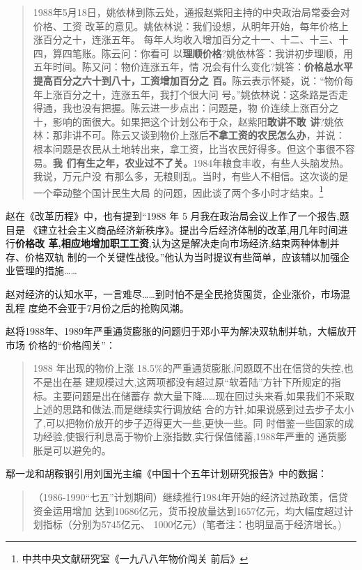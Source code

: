 \begin{quotation}
  1988年5月18日，姚依林到陈云处，通报赵紫阳主持的中央政治局常委会对价格、工资
  改革的意见。姚依林说：我们设想，从明年开始，每年价格上涨百分之十，连涨五年。
  每年人均收入增加百分之十一、十二、十三、十四，算四笔账。陈云问：你看可
  以\textbf{理顺价格}?姚依林答：我讲初步理顺，用五年时间。陈又问：物价连涨五年，情
  况会有什么变化?姚答：\textbf{价格总水平提高百分之六十到八十，工资增加百分之
    百。}陈云表示怀疑，说：“物价每年上涨百分之十，连涨五年，我打个很大问
  号。”姚依林说：这条路是否走得通，我也没有把握。陈云进一步点出：问题是，物
  价连续上涨百分之十，影响的面很大。如果把这个计划公布于众，赵紫阳\textbf{敢讲不敢
    讲}?姚依林：那非讲不可。陈云又谈到物价上涨后\textbf{不拿工资的农民怎么办}，并说：
  根本问题是农民从土地转出来，拿工资，比当农民好得多。但这个事很不容易。\textbf{我
    们有生之年，农业过不了关。}1984年粮食丰收，有些人头脑发热。我说，万元户没
  有那么多，无粮则乱。当时，有些人不相信。这次谈的是一个牵动整个国计民生大局
  的问题，因此谈了两个多小时才结束。\footnote{中共中央文献研究室《一九八八年物价闯关
    前后》}
\end{quotation}
赵在《改革历程》中，也有提到“1988 年 5 月我在政治局会议上作了一个报告,题目是
《建立社会主义商品经济新秩序》。提出今后经济体制的改革,用几年时间进行\textbf{价格改
  革,相应地增加职工工资},认为这是解决走向市场经济,结束两种体制并存、价格双轨
制的一个关键性战役。”他认为当时提议有些简单，应该辅以加强企业管理的措施……

赵对经济的认知水平，一言难尽……到时怕不是全民抢货囤货，企业涨价，市场混乱程
度绝不会亚于7月份之后的抢购风潮。

赵将1988年、1989年严重通货膨胀的问题归于邓小平为解决双轨制并轨，大幅放开市场
价格的“价格闯关”：
\begin{quotation}
  1988 年出现的物价上涨 18.5\%的严重通货膨胀,问题既不出在信贷的失控,也不是出在基
  建规模过大,这两项都没有超过原“软着陆”方针下所规定的指标。主要问题是出在储蓄存
  款大量下降……现在回过头来看,如果我们不采取上述的思路和做法,而是继续实行调放结
  合的方针,如果说感到过去步子太小了,可以把物价放开的步子迈得更大一些,更快一些。同
  时借鉴一些国家的成功经验,使银行利息高于物价上涨指数,实行保值储蓄,1988年严重的
  通货膨胀是可以避免的。
\end{quotation}

鄢一龙和胡鞍钢引用刘国光主编《中国十个五年计划研究报告》中的数据：
\begin{quotation}
（1986-1990“七五”计划期间）继续推行1984年开始的经济过热政策，信贷资金运用增加
达到10686亿元，货币投放量达到1657亿元，均大幅度超过计划指标（分别为5745亿元、
1000亿元）(笔者注：也明显高于经济增长。)\cite{shiyiwu}
\end{quotation}

